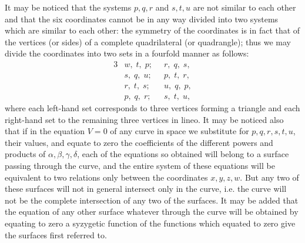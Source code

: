 \documentclass[11pt,a4paper]{book}
\begin{document}
It may be noticed that the systems $p, q, r$ and $s, t, u$ are not similar to each other and that the six coordinates cannot be in any way divided into two systems which are similar to each other: the symmetry of the coordinates is in fact that of the vertices (or sides) of a complete quadrilateral (or quadrangle); thus we may divide the coordinates into two sets in a fourfold manner as follows:
\begin{alignat*}{3}
&w,\; t,\; p;\; &\; r,\; q,\; s,\\
&s,\; q,\; u;\; &\; p,\; t,\; r,\\
&r,\; t,\; s;\; &\; u,\; q,\; p,\\
&p,\; q,\; r;\; &\; s,\; t,\; u,
\end{alignat*}
where each left-hand set corresponds to three vertices forming a triangle and each right-hand set to the remaining three vertices in lineo. It may be noticed also that if in the equation $V = 0$ of any curve in space we substitute for $p, q, r, s, t, u$, their values, and equate to zero the coefficients of the different powers and products of $\alpha, \beta, \gamma, \delta$, each of the equations so obtained will belong to a surface passing through the curve, and the entire system of these equations will be equivalent to two relations only between the coordinates $x, y, z, w$. But any two of these surfaces will not in general intersect only in the curve, i.e. the curve will not be the complete intersection of any two of the surfaces. It may be added that the equation of any other surface whatever through the curve will be obtained by equating to zero a syzygetic function of the functions which equated to zero give the surfaces first referred to.
\end{document}
